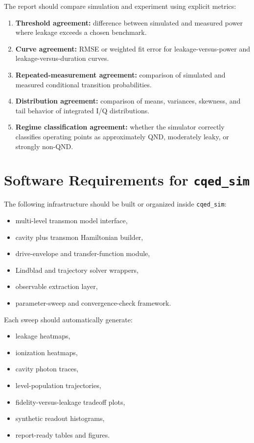 \documentclass[11pt]{article}
\begin{document}
The report should compare simulation and experiment using explicit metrics:
\begin{enumerate}[leftmargin=2em]
    \item \textbf{Threshold agreement:} difference between simulated and measured power
    where leakage exceeds a chosen benchmark.
    \item \textbf{Curve agreement:} RMSE or weighted fit error for leakage-versus-power and
    leakage-versus-duration curves.
    \item \textbf{Repeated-measurement agreement:} comparison of simulated and measured
    conditional transition probabilities.
    \item \textbf{Distribution agreement:} comparison of means, variances, skewness, and
    tail behavior of integrated I/Q distributions.
    \item \textbf{Regime classification agreement:} whether the simulator correctly
    classifies operating points as approximately QND, moderately leaky, or strongly non-QND.
\end{enumerate}

\section{Software Requirements for \texttt{cqed\_sim}}

The following infrastructure should be built or organized inside \texttt{cqed\_sim}:
\begin{itemize}[leftmargin=2em]
    \item multi-level transmon model interface,
    \item cavity plus transmon Hamiltonian builder,
    \item drive-envelope and transfer-function module,
    \item Lindblad and trajectory solver wrappers,
    \item observable extraction layer,
    \item parameter-sweep and convergence-check framework.
\end{itemize}

Each sweep should automatically generate:
\begin{itemize}[leftmargin=2em]
    \item leakage heatmaps,
    \item ionization heatmaps,
    \item cavity photon traces,
    \item level-population trajectories,
    \item fidelity-versus-leakage tradeoff plots,
    \item synthetic readout histograms,
    \item report-ready tables and figures.
\end{itemize}
\end{document}
